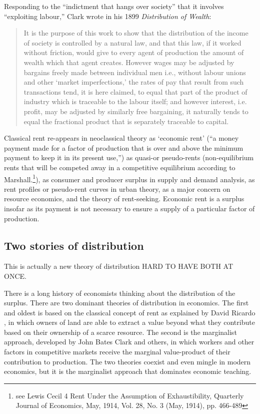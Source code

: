  Responding to the ``indictment that hangs over society'' that it involves ``exploiting labour,'' Clark wrote in his 1899 \textit{Distribution of Wealth}:
\begin{quotation}
 It is the purpose of this work to show that the distribution of the income of society is controlled by a natural law, and that this law, if it worked without friction, would give to every agent of production the amount of wealth which that agent creates. However wages may be adjusted by bargains freely made between individual men i.e., without labour unions and other `market imperfections,' the rates of pay that result from such transactions tend, it is here claimed, to equal that part of the product of industry which is traceable to the labour itself; and however interest, i.e. profit, may be adjusted by similarly free bargaining, it naturally tends to equal the fractional product that is separately traceable to capital. 
\end{quotation}




Classical rent re-appears in neoclassical theory as `economic rent' (``a money payment made for a factor of production that is over and above the minimum payment to keep it in its present use,'')  as quasi-or pseudo-rents (non-equilibrium rents that will be competed away in a competitive equilibrium according to Marshall.\footnote{see Lewis Cecil 4 Rent Under the Assumption of Exhaustibility, Quarterly Journal of Economics, May, 1914, Vol. 28, No. 3 (May, 1914), pp. 466-489}),  as consumer  and producer surplus in supply and demand analysis,  as rent profiles or \gls{pseudo-rent} curves in urban theory, as a major concern on resource economics, and the theory of rent-seeking. Economic rent is a surplus insofar as its payment is not necessary to ensure a supply of a particular factor of production. 



\subsection{Two stories of distribution}
This is actually a new theory of distribution
HARD TO HAVE BOTH AT ONCE.

There is a long history of economists thinking about the distribution of the surplus. %
There are two dominant theories of \gls{distribution} in economics. The first and oldest is based on the classical concept of rent as explained  by David Ricardo \cite{ricardoEssayInfluenceLow1815}, in which owners of land are able to extract a value beyond what they contribute based on their ownership of a scarce resource. The second is the marginalist approach, developed by John Bates Clark and others, in which workers and other factors  in competitive markets receive the \gls{marginal value-product} of their contribution to production. The two theories coexist and even mingle in modern economics, but it is the marginalist approach that dominates economic teaching. 


